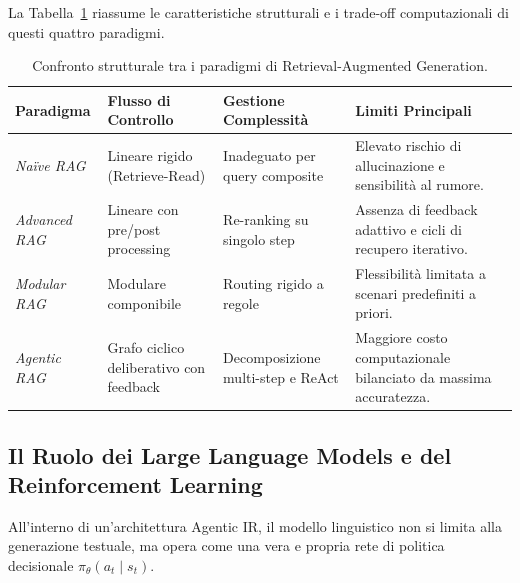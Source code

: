 La Tabella~\ref{tab:confronto_paradigmi} riassume le caratteristiche strutturali e i trade-off computazionali di questi quattro paradigmi.

\begin{table}[htbp]
\centering
\small
\begin{tabularx}{\textwidth}{l p{2.8cm} p{2.8cm} X}
\toprule
\textbf{Paradigma} & \textbf{Flusso di Controllo} & \textbf{Gestione Complessità} & \textbf{Limiti Principali} \\
\midrule
\textit{Naïve RAG} & Lineare rigido (Retrieve-Read) & Inadeguato per query composite & Elevato rischio di allucinazione e sensibilità al rumore. \\
\addlinespace[0.15cm]
\textit{Advanced RAG} & Lineare con pre/post processing & Re-ranking su singolo step & Assenza di feedback adattivo e cicli di recupero iterativo. \\
\addlinespace[0.15cm]
\textit{Modular RAG} & Modulare componibile & Routing rigido a regole & Flessibilità limitata a scenari predefiniti a priori. \\
\addlinespace[0.15cm]
\textit{Agentic RAG} & Grafo ciclico deliberativo con feedback & Decomposizione multi-step e ReAct & Maggiore costo computazionale bilanciato da massima accuratezza. \\
\bottomrule
\end{tabularx}
\caption{Confronto strutturale tra i paradigmi di Retrieval-Augmented Generation.}
\label{tab:confronto_paradigmi}
\end{table}

\subsection{Il Ruolo dei Large Language Models e del Reinforcement Learning}
\label{subsec:llm_reinforcement_learning}
All'interno di un'architettura Agentic IR, il modello linguistico non si limita alla generazione testuale, ma opera come una vera e propria rete di politica decisionale $\pi_\theta(a_t \mid s_t)$.

